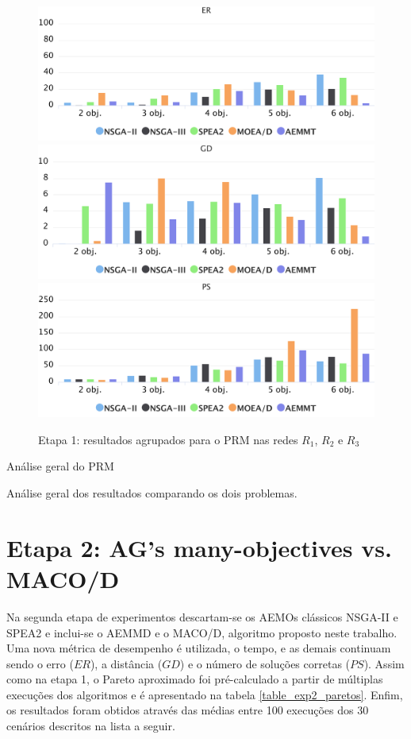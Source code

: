 \begin{figure}[!htbp]
	\caption{Etapa 1: resultados agrupados para o PRM nas redes $R_1$, $R_2$ e $R_3$}
	\label{fig_exp1_mrp_todos}
	\includegraphics[width=1\textwidth]{cap_experimentos/figs/etapa1/er-mrp-todos}
	\includegraphics[width=1\textwidth]{cap_experimentos/figs/etapa1/gd-mrp-todos}
	\includegraphics[width=1\textwidth]{cap_experimentos/figs/etapa1/ps-mrp-todos}
\end{figure}

Análise geral do PRM

Análise geral dos resultados comparando os dois problemas.

\section{Etapa 2: AG's many-objectives vs. MACO/D}

Na segunda etapa de experimentos descartam-se os AEMOs clássicos NSGA-II e SPEA2 e inclui-se o AEMMD e o MACO/D, algoritmo proposto neste trabalho. Uma nova métrica de desempenho é utilizada, o tempo, e as demais continuam sendo o erro ($ER$), a distância ($GD$) e o número de soluções corretas ($PS$). Assim como na etapa 1, o Pareto aproximado foi pré-calculado a partir de múltiplas execuções dos algoritmos e é apresentado na tabela \ref{table_exp2_paretos}. Enfim, os resultados foram obtidos através das médias entre 100 execuções dos 30 cenários descritos na lista a seguir.

